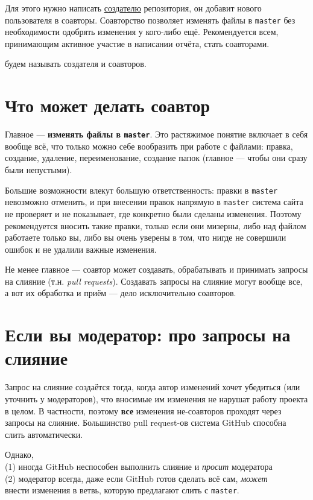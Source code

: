 \documentclass[12pt,a4paper,report]{ncc}
\begin{document}
\ni Для этого нужно написать \underline{создателю} репозитория, он добавит нового пользователя в соавторы. Соавторство позволяет изменять файлы в {\tt master} без необходимости одобрять изменения у кого-либо ещё. Рекомендуется всем, принимающим активное участие в написании отчёта, стать соавторами.

 будем называть создателя и соавторов.


\section{Что может делать соавтор}

\ni Главное — {\bfseries изменять файлы в {\tt master}}. Это растяжимое понятие включает в себя вообще всё, что только можно себе вообразить при работе с файлами: правка, создание, удаление, переименование, создание папок (главное — чтобы они сразу были непустыми).

\ms Большие возможности влекут большую ответственность: правки в {\tt master} невозможно отменить, и при внесении правок напрямую в {\tt master} система сайта не проверяет и не показывает, где конкретно были сделаны изменения. Поэтому рекомендуется вносить такие правки, только если они мизерны, либо над файлом работаете только вы, либо вы очень уверены в том, что нигде не совершили ошибок и не удалили важные изменения.

\ms Не менее главное — соавтор может создавать, обрабатывать и принимать запросы на слияние (т.н. {\it pull requests}). Создавать запросы на слияние могут вообще все, а вот их обработка и приём — дело исключительно соавторов.

\section{Если вы модератор: про запросы на слияние}

\ni Запрос на слияние создаётся тогда, когда автор изменений хочет убедиться (или уточнить у модераторов), что вносимые им изменения не нарушат работу проекта в целом. В частности, поэтому {\bf все} изменения не-соавторов проходят через запросы на слияние. Большинство pull request-ов система GitHub способна слить автоматически.

\ms Однако, \\
\rlap{$\phantom{.}$}\hspace{0.5in} (1) \label{var1} иногда GitHub неспособен выполнить слияние и {\it просит} модератора \\
\rlap{$\phantom{.}$}\hspace{0.5in} (2) \label{var2} модератор всегда, даже если GitHub готов сделать всё сам, {\it может} \\
внести изменения в ветвь, которую предлагают слить с {\tt master}.
\end{document}

